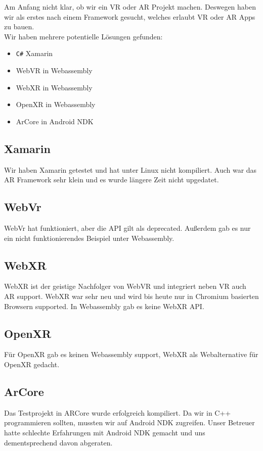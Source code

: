 Am Anfang nicht klar, ob wir ein VR oder AR Projekt machen. Deswegen haben wir als erstes nach einem Framework gesucht, welches erlaubt VR oder AR Apps zu bauen.
\\
Wir haben mehrere potentielle Lösungen gefunden:

\begin{itemize}
  \item \verb|C#| Xamarin
  \item WebVR in Webassembly
  \item WebXR in Webassembly
  \item OpenXR in Webassembly
  \item ArCore in Android NDK
\end{itemize}

\subsection{Xamarin}
Wir haben Xamarin getestet und hat unter Linux nicht
kompiliert. Auch war das AR
Framework sehr klein und es wurde längere Zeit nicht upgedatet.

\subsection{WebVr}
WebVr hat funktioniert, aber die API gilt als deprecated.
Außerdem gab es nur ein nicht
funktionierendes Beispiel unter Webassembly.

\subsection{WebXR}
WebXR ist der geistige Nachfolger von WebVR und integriert neben VR auch AR support.
WebXR war sehr neu und wird bis heute nur in Chromium
basierten Browsern
supported. In Webassembly gab es keine WebXR API.

\subsection{OpenXR}
Für OpenXR gab es keinen Webassembly support, WebXR als Webalternative für OpenXR gedacht.

\subsection{ArCore}
Das Testprojekt in ARCore wurde erfolgreich kompiliert.
Da wir in C++ programmieren sollten, mussten wir auf Android NDK zugreifen.
Unser Betreuer hatte schlechte Erfahrungen mit Android NDK
gemacht und uns dementsprechend davon abgeraten.

